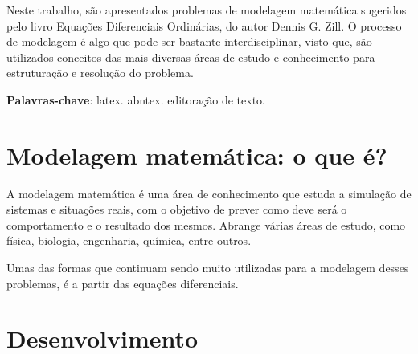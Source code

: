 \documentclass[
	article,			%
	11pt,				%
	oneside,			%
	a4paper,			%
	english,			%
	brazil,				%
	sumario=tradicional
	]{abntex2}
\begin{document}

\frenchspacing 


%
%
\maketitle

\begin{resumoumacoluna}
Neste trabalho, são apresentados problemas de modelagem matemática sugeridos pelo livro Equações Diferenciais Ordinárias, do autor Dennis G. Zill. O processo de modelagem é algo que pode ser bastante interdisciplinar, visto que, são utilizados conceitos das mais diversas áreas de estudo e conhecimento para estruturação e resolução do problema.
 
 \vspace{\onelineskip}
 
 \noindent
 \textbf{Palavras-chave}: latex. abntex. editoração de texto.
\end{resumoumacoluna}

\textual

\section*{Modelagem matemática: o que é?}

A modelagem matemática é uma área de conhecimento que estuda a simulação de sistemas e situações reais, com o objetivo de prever como deve será o comportamento e o resultado dos mesmos. Abrange várias áreas de estudo, como física, biologia, engenharia, química, entre outros.

Umas das formas que continuam sendo muito utilizadas para a modelagem desses problemas, é a partir das equações diferenciais.

\section{Desenvolvimento}
\end{document}
